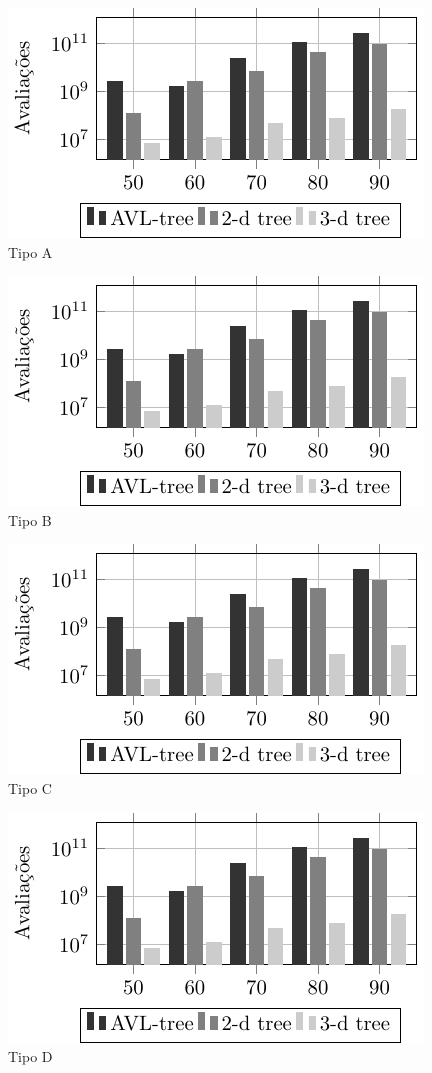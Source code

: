 \centering
\begin{subfigure}{.5\textwidth}
  \centering
  \includegraphics[scale=1.1]{tab/cmp/3dimA}
  \caption{Tipo A}
  \label{fig:sub5}
\end{subfigure}%
\begin{subfigure}{.5\textwidth}
  \centering
  \includegraphics[scale=1.1]{tab/cmp/3dimA}
  \caption{Tipo B}
  \label{fig:sub6}
\end{subfigure}
\begin{subfigure}{.49\textwidth}
  \centering
  \includegraphics[scale=1.1]{tab/cmp/3dimA}
  \caption{Tipo C}
  \label{fig:sub7}
\end{subfigure}
\begin{subfigure}{.49\textwidth}
  \centering
  \includegraphics[scale=1.1]{tab/cmp/3dimA}
  \caption{Tipo D}
  \label{fig:sub8}
\end{subfigure}

